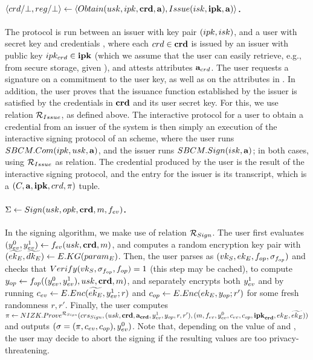 \paragraph{$\langle crd/\bot,reg/\bot \rangle \gets
  \langle Obtain(usk,ipk,\mathbf{crd},\mathbf{a}),Issue(isk,\mathbf{ipk},\mathbf{a})\rangle$.} %
The protocol is run between an issuer with key pair $(ipk,isk)$, and a user
with secret key \usk and credentials \scred, where each $crd \in \mathbf{crd}$ is
issued by an issuer with public key $ipk_{crd} \in \mathbf{ipk}$ (which we assume
that the user can easily retrieve,
e.g., from secure storage, given \cred), and attests attributes
$\mathbf{a}_{crd}$. The user requests a signature on a commitment to the user key,
as well as on the attributes in \attrs. In addition, the user proves that the
issuance function \fissue established by the issuer is satisfied by the
credentials in $\mathbf{crd}$
and its user secret key. For this, we use relation $\mathcal{R}_{Issue}$, as
defined above. The interactive protocol for a user to obtain a credential from
an issuer of the system is then simply an execution of the interactive signing
protocol of an \SBCM scheme, where the user runs $SBCM.Com(ipk,usk,\mathbf{a})$,
and the issuer runs $SBCM.Sign(isk,\mathbf{a})$; in both cases, using
$\mathcal{R}_{Issue}$ as \NIZK relation. The credential \cred produced by the user
is the result of the interactive signing protocol, and the \utrans entry for
the issuer is its transcript, which is a $(C,\mathbf{a},\mathbf{ipk},crd,\pi)$ tuple.

\paragraph{$\Sigma \gets Sign(usk,opk,\mathbf{crd},m,f_{ev})$.} %
In the signing algorithm, we make use of relation $\mathcal{R}_{Sign}$.
% 
The user first evaluates $(y_{ev}^0,y_{ev}^1) \gets f_{ev} (usk,\mathbf{crd},m)$,
and computes a random encryption key pair with $(\widetilde{ek_{E}},
\widetilde{dk_{E}}) \gets E.KG(param_{E})$. Then, the user parses \opk as $(vk_{S},ek_{E},
f_{op},\sigma_{f_{op}})$ and checks that $Verify(vk_{S},\sigma_{f_{op}},f_{op}) = 1$
(this step may be cached), to compute $y_{op} \gets f_{op}((y_{ev}^0,
y_{ev}^1),usk,\mathbf{crd},m)$, and separately encrypts both $y_{ev}^1$ and
\yinsp by running $c_{ev} \gets E.Enc(\widetilde{ek_{E}},y_{ev}^1;r)$ and $c_{op} \gets
E.Enc(ek_{E},y_{op}; r')$ for some fresh randomness $r,r'$. Finally, the user
computes $\pi \gets NIZK.Prove^{\mathcal{R}_{Sign}}(crs_{Sign},(usk,
\mathbf{crd}, \mathbf{a}_{\mathbf{crd}},y_{ev}^1,y_{op},r,r'),(m,f_{ev},y_{ev}^0,c_{ev},c_{op},
\mathbf{ipk}_{\mathbf{crd}},ek_{E},\widetilde{ek_{E}}))$ and outputs $(\sigma = (\pi,c_{ev},
c_{op}),y_{ev}^0)$. Note that, depending on the value of \Yeval and \yinsp, the
user may decide to abort the signing if the resulting values are too
privacy-threatening.

